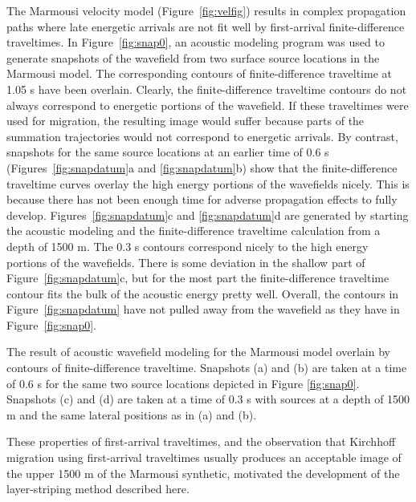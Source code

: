 The Marmousi velocity model (Figure~\ref{fig:velfig}) results in
complex propagation paths where late energetic arrivals are not fit well 
by first-arrival finite-difference traveltimes.
In Figure~\ref{fig:snap0},
an acoustic modeling program was used to generate snapshots of 
the wavefield from two surface source locations in the Marmousi model.
The corresponding
contours of finite-difference traveltime at 1.05 s have been overlain.
Clearly, the finite-difference traveltime contours do not always correspond
to energetic portions of the wavefield. If these traveltimes were
used for migration, the resulting image would suffer because 
parts of the summation trajectories would not correspond to 
energetic arrivals. By contrast, snapshots for the same source locations
at an earlier time of 0.6 s (Figures~\ref{fig:snapdatum}a and \ref{fig:snapdatum}b)
show that the finite-difference traveltime curves overlay the
high energy portions of the wavefields nicely. This is because there 
has not been enough time for adverse propagation effects to fully develop.
Figures~\ref{fig:snapdatum}c and \ref{fig:snapdatum}d are generated by
starting the acoustic modeling and the finite-difference traveltime
calculation from a depth of 1500 m. The 0.3 s contours correspond nicely
to the high energy portions of the wavefields. There is some deviation
in the shallow part of Figure~\ref{fig:snapdatum}c, but for the most part
the finite-difference traveltime contour fits the bulk of the acoustic 
energy pretty well. Overall, the contours in Figure~\ref{fig:snapdatum}
have not pulled away from the wavefield as they have in Figure~\ref{fig:snap0}.


{The result of acoustic wavefield modeling for the Marmousi model overlain
by contours of finite-difference traveltime. Snapshots (a) and (b) are
taken at a time of 0.6 s for the same two source locations depicted
in Figure \protect \ref{fig:snap0}. Snapshots (c) and (d) 
are taken at a time of 0.3 s with sources at a depth of 1500 m 
and the same lateral positions as in (a) and (b).}

These properties of first-arrival traveltimes, and the observation that
Kirchhoff migration using first-arrival traveltimes usually produces an
acceptable image of the upper 1500 m of the Marmousi synthetic, 
motivated the development of the layer-striping method described here.


